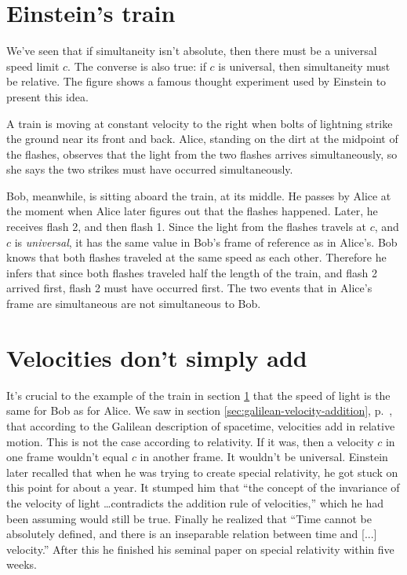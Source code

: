 \section{Einstein's train}\label{sec:einstein-train}

We've seen that if simultaneity isn't absolute, then there must be a universal speed limit $c$.
The converse is also true: if $c$ is universal, then simultaneity must be relative.
The figure shows a famous thought experiment used by Einstein to present this idea.

\begin{figure}[h]\label{fig:einstein-train}
\end{figure}

A train is moving at constant velocity to the right when bolts of lightning
strike the ground near its front and back. Alice, standing on the dirt at
the midpoint of the flashes, observes that the light from the two flashes
arrives simultaneously, so she says the two strikes must have occurred
simultaneously.

Bob, meanwhile, is sitting aboard the train, at its middle.
He passes by Alice at the moment when Alice later figures out that the
flashes happened. Later, he receives flash 2, and then flash 1. Since the light
from the flashes travels at $c$, and $c$ is \emph{universal}, it has the same
value in Bob's frame of reference as in Alice's. Bob knows that both flashes
traveled at the same speed as each other. Therefore he infers
that since both flashes traveled half the length of the train, and flash 2 arrived first,
flash 2 must
have occurred first. The two events that in Alice's frame are simultaneous
are not simultaneous to Bob.

\section{Velocities don't simply add}

It's crucial to the example of the train
in section \ref{sec:einstein-train} that the speed of light is the same for Bob as for Alice.
We saw in section \ref{sec:galilean-velocity-addition}, p.~\pageref{sec:galilean-velocity-addition},
that according to the Galilean description of spacetime, velocities add in relative motion.
This is not the case according to relativity.
If it was, then a velocity $c$ in one frame wouldn't equal $c$ in another frame.
It wouldn't be universal. 
Einstein later recalled that when he was trying to create special relativity, he got stuck on
this point for about a year.
It stumped him that ``the concept of the invariance
of the velocity of light \ldots contradicts the addition rule of velocities,'' which he had been assuming
would still be true. Finally he realized that ``Time cannot be absolutely defined, and there is
an inseparable relation between time and [...] velocity.'' After this he finished his seminal paper
on special relativity within five weeks.

